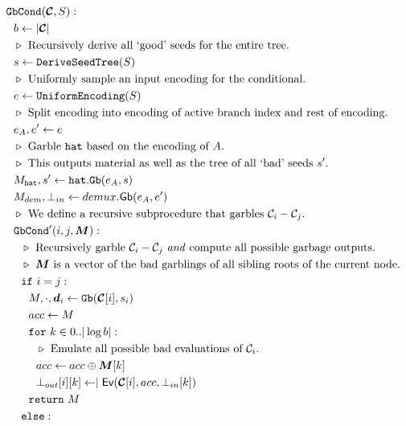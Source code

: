 \begin{figure}
  \begin{align*}
    &\gbcond(\vec{\cir}, S):\\
    &~~b \gets | \vec{\cir} |\\
    &~~\codecomment{Recursively derive all `good' seeds for the entire tree.}\\
    &~~s \gets \mathtt{DeriveSeedTree}(S)\\
    &~~\codecomment{Uniformly sample an input encoding for the conditional.}\\
    &~~e \gets \mathtt{UniformEncoding}(S)\\
    &~~\codecomment{Split encoding into encoding of active branch
    index and rest of encoding.}\\
    &~~e_\aid, e' \gets e\\
    &~~\codecomment{Garble \gadget\ based on the encoding of \aid.}\\
    &~~\codecomment{This outputs material as well as the tree of all
    `bad' seeds $s'$.}\\
    &~~\mat_\gadget, s' \gets \gadget.\mathtt{Gb}(e_\aid, s)\\
    &~~\mat_{dem}, \bot_{in} \gets \gbdem(e_\aid, e')\\
    &~~\codecomment{We define a recursive subprocedure that garbles $\cir_i - \cir_j$.}\\
    &~~\gbcond'(i, j, \vec{\mat}):\\
    &~~~~\codecomment{Recursively garble $\cir_i - \cir_j$ \emph{and}
    compute all possible garbage outputs.}\\
    &~~~~\codecomment{$\vec{\mat}$ is a vector of the bad garblings of
      all sibling roots of the current node.}\\
    &~~~~\cif~i = j:\\
    &~~~~~~\mat, \cdot, \vec{d}_i \gets \gb(\vec{\cir}[i], s_{i})\\
    &~~~~~~acc \gets \mat\\
    &~~~~~~\cfor~k \in 0..|\log b|:\\
    &~~~~~~~~\codecomment{Emulate all possible bad evaluations of $\cir_i$.}\\
    &~~~~~~~~acc \gets acc \oplus \vec{\mat}[k]\\
    &~~~~~~~~\bot_{out}[i][k] \gets \mid \gEv(\vec{\cir}[i], acc,
    \bot_{in}[k])\\
    &~~~~~~\creturn~M\\
    &~~~~\celse:\\

\end{align*}
\end{figure}
